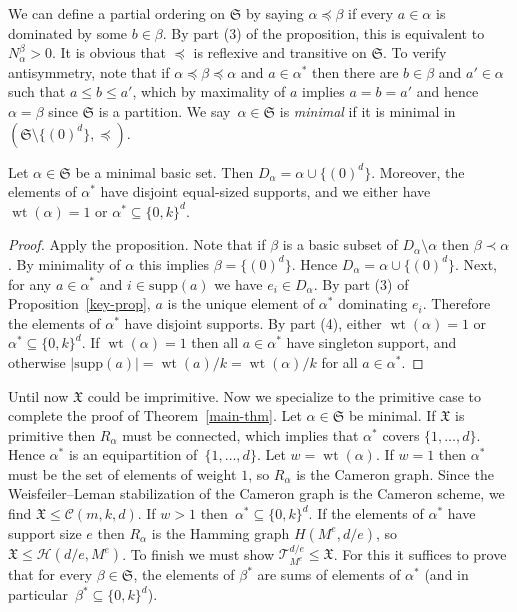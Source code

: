 \documentclass[ALCO]{cedram}
\newcommand{\cT}{{\mathcal T}}
\newcommand{\cC}{{\mathcal C}}
\newcommand{\cH}{{\mathcal H}}
\newcommand{\fS}{\mathfrak S}
\newcommand{\wt}{\operatorname{wt}}
\newcommand{\supp}{\mathrm{supp}}
\def\X{\mathfrak{X}}
\renewcommand{\subset}{\subseteq}
\newcommand{\cT}{{\mathcal T}}
\newcommand{\cH}{{\mathcal H}}
\begin{document}
We can define a partial ordering on $\fS$ by saying $\alpha \preceq \beta$ if every $a \in \alpha$ is dominated by some $b \in \beta$.
By part (3) of the proposition, this is equivalent to $N^\beta_\alpha > 0$.
It is obvious that $\preceq$ is reflexive and transitive on $\fS$.
To verify antisymmetry, note that if $\alpha \preceq \beta \preceq \alpha$ and $a \in \alpha^*$ then there are $b \in \beta$ and $a' \in \alpha$ such that $a \le b \le a'$, which by maximality of $a$ implies $a = b = a'$ and hence $\alpha = \beta$ since $\fS$ is a partition.
We say~$\alpha \in \fS$ is \emph{minimal} if it is minimal in $(\fS \setminus \{(0)^d\}, \preceq)$.

\begin{cor}
    Let $\alpha \in \fS$ be a minimal basic set.
    Then $D_\alpha = \alpha \cup \{(0)^d\}$.
    Moreover, the elements of $\alpha^*$ have disjoint equal-sized supports,
    and we either have $\wt(\alpha) = 1$ or $\alpha^* \subset \{0, k\}^d$.
\end{cor}
\begin{proof}
    Apply the proposition.
    Note that if $\beta$ is a basic subset of $D_\alpha \setminus \alpha$ then $\beta \prec \alpha$.
    By minimality of $\alpha$ this implies $\beta = \{(0)^d\}$.
    Hence $D_\alpha = \alpha \cup \{(0)^d\}$.
    Next,
    for any $a \in \alpha^*$ and $i \in \supp(a)$ we have $e_i \in D_\alpha$.
    By part (3) of Proposition~\ref{key-prop}, $a$ is the unique element of $\alpha^*$ dominating $e_i$.
    Therefore the elements of $\alpha^*$ have disjoint supports.
    By part (4), either $\wt(\alpha) = 1$ or $\alpha^* \subset \{0, k\}^d$.
    If $\wt(\alpha) = 1$ then all $a \in \alpha^*$ have singleton support,
    and otherwise $|\supp(a)| = \wt(a) / k = \wt(\alpha) / k$ for all $a \in \alpha^*$.
\end{proof}

Until now $\X$ could be imprimitive.
Now we specialize to the primitive case to complete the proof of Theorem~\ref{main-thm}.
Let $\alpha \in \fS$ be minimal.
If $\X$ is primitive then $R_\alpha$ must be connected,
which implies that $\alpha^*$ covers $\{1, \dots, d\}$.
Hence $\alpha^*$ is an equipartition of~$\{1, \dots ,d\}$.
Let $w = \wt(\alpha)$.
If $w = 1$ then $\alpha^*$ must be the set of elements of weight $1$, so $R_\alpha$ is the Cameron graph.
Since the Weisfeiler--Leman stabilization of the Cameron graph is the Cameron scheme, we find $\X \le \cC(m, k, d)$.
If $w > 1$ then~$\alpha^* \subset \{0, k\}^d$.
If the elements of $\alpha^*$ have support size $e$ 
then $R_\alpha$ is the Hamming graph $H(M^e, d/e)$, so $\X \le \cH(d/e, M^e)$.
To finish we must show $\cT_{M^e}^{d/e} \le \X$.
For this it suffices to prove that for every $\beta \in \fS$, the elements of $\beta^*$ are sums of elements of $\alpha^*$ (and in particular~$\beta^* \subset \{0, k\}^d$).
\end{document}
